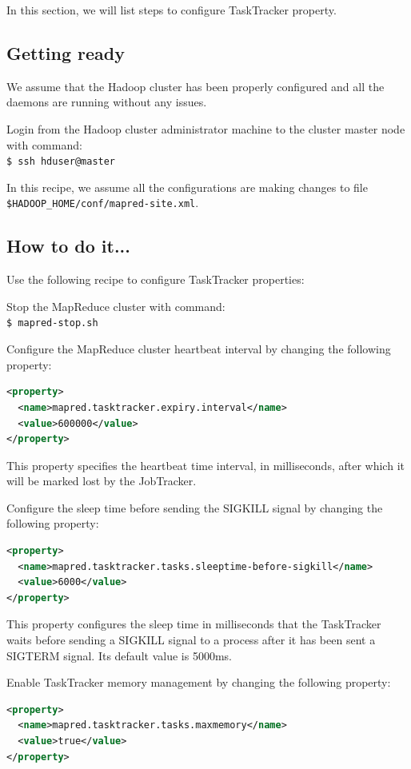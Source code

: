 In this section, we will list steps to configure TaskTracker property.
\subsection*{Getting ready}
We assume that the Hadoop cluster has been properly configured and all the daemons are running without any issues.

Login from the Hadoop cluster administrator machine to the cluster master node with command: \\
\verb|$ ssh hduser@master|

In this recipe, we assume all the configurations are making changes to file \verb|$HADOOP_HOME/conf/mapred-site.xml|.
\subsection*{How to do it...}
Use the following recipe to configure TaskTracker properties:

Stop the MapReduce cluster with command: \\
\verb|$ mapred-stop.sh|

Configure the MapReduce cluster heartbeat interval by changing the following property:
\lstset{style=bashstyle}
\begin{lstlisting}[language=XML]
<property>
  <name>mapred.tasktracker.expiry.interval</name>
  <value>600000</value>
</property>
\end{lstlisting}

This property specifies the heartbeat time interval, in milliseconds, after which it will be marked lost by the JobTracker.

Configure the sleep time before sending the SIGKILL signal by changing the following property:
\lstset{style=bashstyle}
\begin{lstlisting}[language=XML]
<property>
  <name>mapred.tasktracker.tasks.sleeptime-before-sigkill</name>
  <value>6000</value>
</property>
\end{lstlisting}

This property configures the sleep time in milliseconds that the TaskTracker waits before sending a SIGKILL signal to a process after it has been sent a SIGTERM signal. Its default value is 5000ms.

Enable TaskTracker memory management by changing the following property:
\lstset{style=bashstyle}
\begin{lstlisting}[language=XML]
<property>
  <name>mapred.tasktracker.tasks.maxmemory</name>
  <value>true</value>
</property>
\end{lstlisting}

